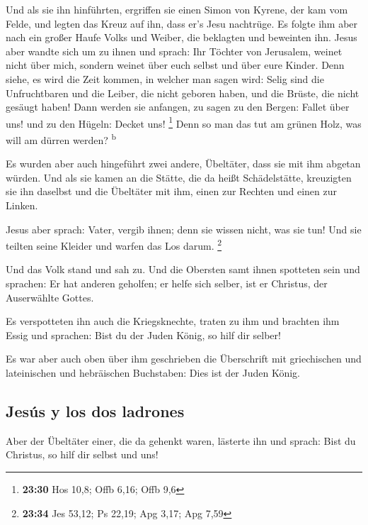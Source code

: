  Und als sie ihn hinführten, ergriffen sie einen Simon
von Kyrene, der kam vom Felde, und legten das Kreuz auf ihn, dass er's
Jesu nachtrüge.  Es folgte ihm aber nach ein großer Haufe
Volks und Weiber, die beklagten und beweinten ihn.  Jesus
aber wandte sich um zu ihnen und sprach: Ihr Töchter von Jerusalem,
weinet nicht über mich, sondern weinet über euch selbst und über eure
Kinder.  Denn siehe, es wird die Zeit kommen, in welcher
man sagen wird: Selig sind die Unfruchtbaren und die Leiber, die nicht
geboren haben, und die Brüste, die nicht gesäugt haben! 
Dann werden sie anfangen, zu sagen zu den Bergen: Fallet über uns! und
zu den Hügeln: Decket uns! \footnote{\textbf{23:30} Hos 10,8; Offb 6,16;
  Offb 9,6}  Denn so man das tut am grünen Holz, was will
am dürren werden? \textsuperscript{b}

 Es wurden aber auch hingeführt zwei andere, Übeltäter,
dass sie mit ihm abgetan würden.  Und als sie kamen an
die Stätte, die da heißt Schädelstätte, kreuzigten sie ihn daselbst und
die Übeltäter mit ihm, einen zur Rechten und einen zur Linken.

 Jesus aber sprach: Vater, vergib ihnen; denn sie wissen
nicht, was sie tun! Und sie teilten seine Kleider und warfen das Los
darum. \footnote{\textbf{23:34} Jes 53,12; Ps 22,19; Apg 3,17; Apg 7,59}

 Und das Volk stand und sah zu. Und die Obersten samt
ihnen spotteten sein und sprachen: Er hat anderen geholfen; er helfe
sich selber, ist er Christus, der Auserwählte Gottes.

 Es verspotteten ihn auch die Kriegsknechte, traten zu
ihm und brachten ihm Essig  und sprachen: Bist du der
Juden König, so hilf dir selber!

 Es war aber auch oben über ihm geschrieben die
Überschrift mit griechischen und lateinischen und hebräischen
Buchstaben: Dies ist der Juden König.

\hypertarget{jesuxfas-y-los-dos-ladrones}{%
\subsection{Jesús y los dos
ladrones}\label{jesuxfas-y-los-dos-ladrones}}

 Aber der Übeltäter einer, die da gehenkt waren, lästerte
ihn und sprach: Bist du Christus, so hilf dir selbst und uns!

